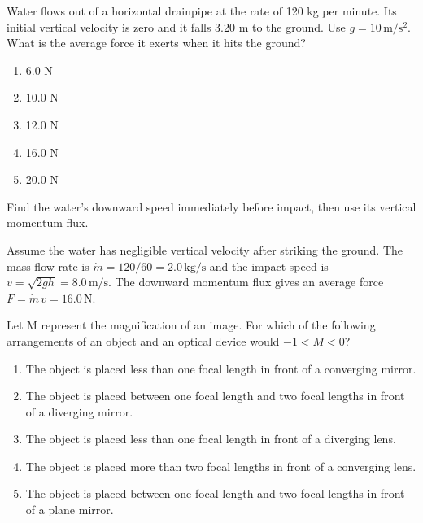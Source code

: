 \item \label{prob:33}
Water flows out of a horizontal drainpipe at the rate of 120 kg per minute. Its initial vertical velocity is zero and it falls 3.20 m to the ground. Use $g=10\,\mathrm{m/s^2}$. What is the average force it exerts when it hits the ground?
\begin{enumerate}[label=(\Alph*)]
    \item 6.0 N
    \item 10.0 N
    \item 12.0 N
    \item 16.0 N
    \item 20.0 N
\end{enumerate}

\begin{answerbox}
\end{answerbox}
\begin{insightbox}
Find the water's downward speed immediately before impact, then use its vertical momentum flux.
\end{insightbox}
\begin{solutionbox}

Assume the water has negligible vertical velocity after striking the ground. The mass flow rate is $\dot m=120/60=2.0\,\text{kg/s}$ and the impact speed is $v=\sqrt{2gh}=8.0\,\text{m/s}$. The downward momentum flux gives an average force $F=\dot m\,v=16.0\,\text{N}$.
\end{solutionbox}

\item \label{prob:34}
Let M represent the magnification of an image. For which of the following arrangements of an object and an optical device would $-1 < M < 0$? 
\begin{enumerate}[label=(\Alph*)]
    \item The object is placed less than one focal length in front of a converging mirror.
    \item The object is placed between one focal length and two focal lengths in front of a diverging mirror.
    \item The object is placed less than one focal length in front of a diverging lens.
    \item The object is placed more than two focal lengths in front of a converging lens.
    \item The object is placed between one focal length and two focal lengths in front of a plane mirror.
\end{enumerate}

